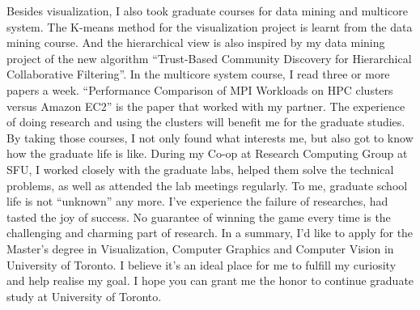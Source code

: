 \documentclass{article}
\begin{document}
Besides visualization, I also took graduate courses for data mining and multicore system. The K-means method for the visualization project is learnt from the data mining course. And the hierarchical view is also inspired by my data mining project of the new algorithm “Trust-Based Community Discovery for Hierarchical Collaborative Filtering”. In the multicore system course, I read three or more papers a week. “Performance Comparison of MPI Workloads on HPC clusters versus Amazon EC2” is the paper that worked with my partner. The experience of doing research and using the clusters will benefit me for the graduate studies.  \\


By taking those courses, I not only found what interests me, but also got to know how the graduate life is like. During my Co-op at Research Computing Group at SFU, I worked closely with the graduate labs, helped them solve the technical problems, as well as attended the lab meetings regularly. To me, graduate school life is not “unknown” any more. I’ve experience the failure of researches, had tasted the joy of success. No guarantee of winning the game every time is the challenging and charming part of research. In a summary, I’d like to apply for the Master’s degree in Visualization, Computer Graphics and Computer Vision in University of Toronto. I believe it’s an ideal place for me to fulfill my curiosity and help realise my goal. I hope you can grant me the honor to continue graduate study at University of Toronto.  \\
\end{document}
